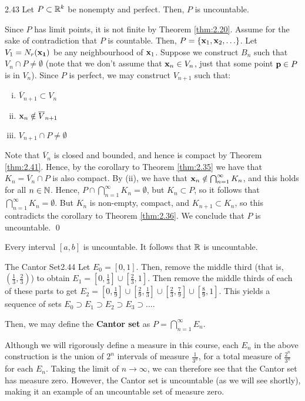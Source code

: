 \setcounter{rudin}{42}
\begin{theorem}{}{2.43}
    Let $P \subset \mathbb{R}^k$ be nonempty and perfect. Then, $P$ is uncountable.
\end{theorem}
\begin{nproof}
    Since $P$ has limit points, it is not finite by Theorem \ref{thm:2.20}. Assume for the sake of contradiction that $P$ is countable. Then, $P = \set{\ensuremath{\mathbf{x}}_1, \ensuremath{\mathbf{x}}_2, \ldots}$. Let $V_1 = N_r(\mathbf{x_1})$ be any neighbourhood of $\mathbf{x}_1$. Suppose we construct $B_n$ such that $V_n \cap P \neq \emptyset$ (note that we don't assume that $\mathbf{x}_n \in V_n$, just that some point $\mathbf{p} \in P$ is in $V_n$). Since $P$ is perfect, we may construct $V_{n+1}$ such that:
    \begin{enumerate}[(i)]
        \item $\overline{V}_{n+1} \subset V_n$
        \item $\mathbf{x}_n \notin \overline{V}_{n+1}$
        \item $V_{n+1} \cap P \neq \emptyset$
    \end{enumerate}
    Note that $\overline{V}_{n}$ is closed and bounded, and hence is compact by Theorem \ref{thm:2.41}. Hence, by the corollary to Theorem \ref{thm:2.35} we have that $K_n = \overline{V}_n \cap P$ is also compact. By (ii), we have that $\mathbf{x}_n \notin \bigcap_{n=1}^\infty K_n$, and this holds for all $n \in \mathbb{N}$. Hence, $P \cap \bigcap_{n=1}^\infty K_n = \emptyset$, but $K_n \subset P$, so it follows that $\bigcap_{n=1}^\infty K_n = \emptyset$. But $K_n$ is non-empty, compact, and $K_{n+1} \subset K_n$, so this contradicts the corollary to Theorem \ref{thm:2.36}. We conclude that $P$ is uncountable. \qed
\end{nproof}

\begin{ncorollary}{}{}
    Every interval $[a, b]$ is uncountable. It follows that $\mathbb{R}$ is uncountable.
\end{ncorollary}

\begin{definition}{The Cantor Set}{2.44}
    Let $E_0 = [0, 1]$. Then, remove the middle third (that is, $(\frac{1}{3}, \frac{2}{3})$) to obtain $E_1 = [0, \frac{1}{3}]\cup[\frac{2}{3}, 1]$. Then remove the middle thirds of each of these parts to get $E_2 = [0, \frac{1}{9}]\cup[\frac{2}{9}, \frac{1}{3}]\cup[\frac{2}{3}, \frac{7}{9}]\cup[\frac{8}{9}, 1]$. This yields a sequence of sets $E_0 \supset E_1 \supset E_2 \supset E_3 \supset \ldots$.

    Then, we may define the \textbf{Cantor set} as $P = \bigcap_{n=1}^\infty E_n$. 
\end{definition}
\noindent Although we will rigorously define a measure in this course, each $E_n$ in the above construction is the union of $2^n$ intervals of measure $\frac{1}{3^n}$, for a total measure of $\frac{2^n}{3^n}$ for each $E_n$. Taking the limit of $n \rightarrow \infty$, we can therefore see that the Cantor set has measure zero. However, the Cantor set is uncountable (as we will see shortly), making it an example of an uncountable set of measure zero.

